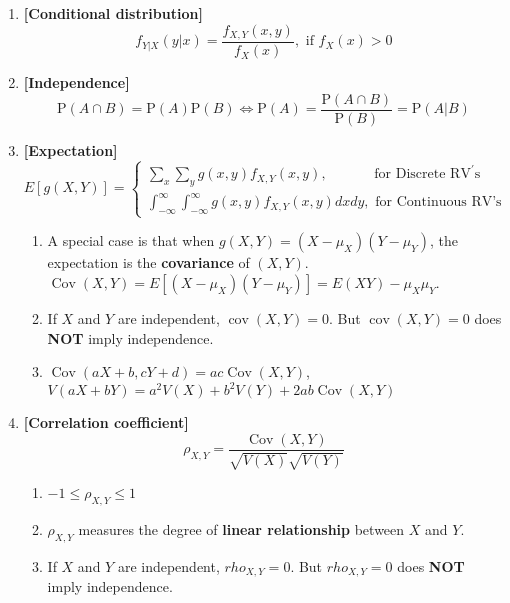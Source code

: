 \documentclass[a4paper]{article}
\begin{document}
\begin{enumerate}
\item
\textbf{[Conditional distribution]}
\begin{equation}
    f_{Y|X}(y | x)=\frac{f_{X, Y}(x, y)}{f_{X}(x)}, \text { if } f_{X}(x)>0
\end{equation}

\item
\textbf{[Independence]}
\begin{equation}
    \mathrm{P}(A \cap B)=\mathrm{P}(A) \mathrm{P}(B) \Longleftrightarrow \mathrm{P}(A)=\frac{\mathrm{P}(A \cap B)}{\mathrm{P}(B)}=\mathrm{P}(A | B)
\end{equation}

\item
\textbf{[Expectation]}
\begin{equation}
    E[g(X, Y)]=\left\{\begin{array}{l}{\sum_{x} \sum_{y} g(x, y) f_{X, Y}(x, y), \quad \quad \quad \text { for Discrete } \mathrm{RV}^{\prime} \mathrm{s}} \\ {\int_{-\infty}^{\infty} \int_{-\infty}^{\infty} g(x, y) f_{X, Y}(x, y) d x d y, \text { for Continuous RV's }}\end{array}\right.
\end{equation}

\begin{enumerate}
    \item 
    A special case is that when $g(X, Y)=\left(X-\mu_{X}\right)\left(Y-\mu_{Y}\right)$, the expectation is the \textbf{covariance} of $(X, Y)$.
    $\operatorname{Cov}(X, Y)=E\left[\left(X-\mu_{X}\right)\left(Y-\mu_{Y}\right)\right] = E(X Y)-\mu_{X} \mu_{Y}$.
    
    \item
    If $X$ and $Y$ are independent, $\operatorname{cov}(X, Y)=0$. But $\operatorname{cov}(X, Y)=0$ does \textbf{NOT} imply independence.
    
    \item
    $\operatorname{Cov}(a X+b, c Y+d)=a c \operatorname{Cov}(X, Y)$, $V(a X+b Y)=a^{2} V(X)+b^{2} V(Y)+2 a b \operatorname{Cov}(X, Y)$
\end{enumerate}

\item
\textbf{[Correlation coefficient]}
\begin{equation}
    \rho_{X, Y}=\frac{\operatorname{Cov}(X, Y)}{\sqrt{V(X)} \sqrt{V(Y)}}
\end{equation}

\begin{enumerate}
    \item 
    $-1 \leq \rho_{X, Y} \leq 1$
    
    \item
    $\rho_{X, Y}$ measures the degree of \textbf{linear relationship} between $X$ and $Y$.
    
    \item
    If $X$ and $Y$ are independent, $rho_{X, Y} = 0$. But $rho_{X, Y} = 0$ does \textbf{NOT} imply independence.
\end{enumerate}

 
\end{enumerate}
\end{document}

